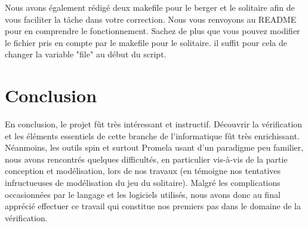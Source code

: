 \documentclass[12pt, a4paper]{report}
\begin{document}
Nous avons également rédigé deux makefile pour le berger et le solitaire afin de vous faciliter la tâche dans votre correction. Nous vous renvoyons au README pour en comprendre le fonctionnement. Sachez de plus que vous pouvez modifier le fichier pris en compte par le makefile pour le solitaire. il suffit pour cela de changer la variable "file" au début du script.

\section{Conclusion}


En conclusion, le projet fût très intéressant et instructif. Découvrir la vérification et les éléments essentiels de cette branche de l'informatique fût très enrichissant. Néanmoins, les outils spin et surtout Promela usant d'un paradigme peu familier, nous avons rencontrés quelques difficultés, en particulier vis-à-vis de la partie conception et modélisation, lors de nos travaux (en témoigne nos tentatives infructueuses de modélisation du jeu du solitaire). Malgré les complications occasionnées par le langage et les logiciels utilisés, nous avons donc au final apprécié effectuer ce travail qui constitue nos premiers pas dans le domaine de la vérification. 
\end{document}
